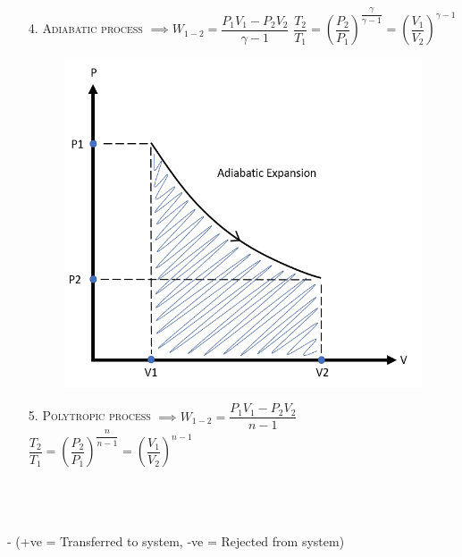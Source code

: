 \documentclass[8pt]{article}
\begin{document}
\begin{itemize}
\begin{figure}[H]
				\centering
			\end{figure}\hrulefill
		\item[4.] \textsc{Adiabatic process}  $\implies \boxed{W_{1-2} = \dfrac{P_1V_1-P_2V_2}{\gamma -1}}$ $\boxed{\dfrac{T_2}{T_1}=\left(\dfrac{P_2}{P_1}\right)^{\dfrac{\gamma}{\gamma -1}}=\left(\dfrac{V_1}{V_2}\right)^{\gamma -1}}$
			\begin{figure}[H]
				\includegraphics[scale=0.3]{adiabatic.png}
				\centering
			\end{figure}\hrulefill
		\item[5.] \textsc{Polytropic process}  $\implies \boxed{W_{1-2} = \dfrac{P_1V_1-P_2V_2}{n-1}}$ $\boxed{\dfrac{T_2}{T_1}=\left(\dfrac{P_2}{P_1}\right)^{\dfrac{n}{n-1}}=\left(\dfrac{V_1}{V_2}\right)^{n-1}}$
	\end{itemize}
	\hrulefill\\\\
\\ - (+ve = Transferred to system, -ve = Rejected from system)
\end{document}
